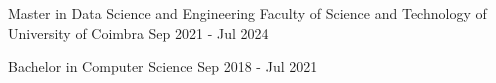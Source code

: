 

\begin{cventries}

  
  \cveducation
    {Master in Data Science and Engineering} %
    {Faculty of Science and Technology of University of Coimbra} %
    {}  %
    {Sep 2021  - Jul 2024} %

  \cveducation
    {Bachelor in Computer Science} %
    {} %
    {}  %
    {Sep 2018  - Jul 2021} %

\end{cventries}
